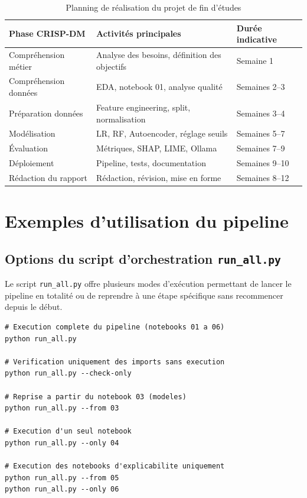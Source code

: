 \documentclass[12pt,a4paper,twoside]{report}
\begin{document}
\begin{table}[H]
\centering
\caption{Planning de réalisation du projet de fin d'études}
\label{tab:planning}
\begin{tabular}{lll}
\toprule
\textbf{Phase CRISP-DM} & \textbf{Activités principales} & \textbf{Durée indicative} \\
\midrule
Compréhension métier   & Analyse des besoins, définition des objectifs & Semaine 1 \\
Compréhension données  & EDA, notebook 01, analyse qualité & Semaines 2--3 \\
Préparation données    & Feature engineering, split, normalisation & Semaines 3--4 \\
Modélisation           & LR, RF, Autoencoder, réglage seuils & Semaines 5--7 \\
Évaluation             & Métriques, SHAP, LIME, Ollama & Semaines 7--9 \\
Déploiement            & Pipeline, tests, documentation & Semaines 9--10 \\
Rédaction du rapport   & Rédaction, révision, mise en forme & Semaines 8--12 \\
\bottomrule
\end{tabular}
\end{table}

\chapter{Exemples d'utilisation du pipeline}

\section{Options du script d'orchestration \texttt{run\_all.py}}
\label{sec:run_all_options}

Le script \texttt{run\_all.py} offre plusieurs modes d'exécution permettant de lancer le pipeline en totalité ou de reprendre à une étape spécifique sans recommencer depuis le début.

\begin{lstlisting}[caption={Options complètes du script run\_all.py},label={lst:run_all}]
# Execution complete du pipeline (notebooks 01 a 06)
python run_all.py

# Verification uniquement des imports sans execution
python run_all.py --check-only

# Reprise a partir du notebook 03 (modeles)
python run_all.py --from 03

# Execution d'un seul notebook
python run_all.py --only 04

# Execution des notebooks d'explicabilite uniquement
python run_all.py --from 05
python run_all.py --only 06
\end{lstlisting}
\end{document}
